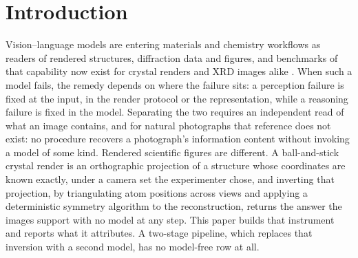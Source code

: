\section{Introduction}
Vision--language models are entering materials and chemistry workflows as readers of rendered structures,
diffraction data and figures, and benchmarks of that capability now exist for crystal renders and XRD images
alike \citep{xcrys2506,xrdbench2605}. When such a model fails, the remedy depends on where the failure sits:
a perception failure is fixed at the input, in the render protocol or the representation, while a reasoning
failure is fixed in the model. Separating the two requires an independent read of what an image contains,
and for natural photographs that reference does not exist: no procedure recovers a photograph's
information content without invoking a model of some kind. Rendered scientific figures are different. A
ball-and-stick crystal render is an orthographic projection of a structure whose coordinates are known
exactly, under a camera set the experimenter chose, and inverting that projection, by triangulating atom
positions across views and applying a deterministic symmetry algorithm to the reconstruction, returns the
answer the images support with no model at any step. This paper builds that instrument and reports what it
attributes. A two-stage pipeline, which replaces that inversion with a second model, has no model-free row at
all.

